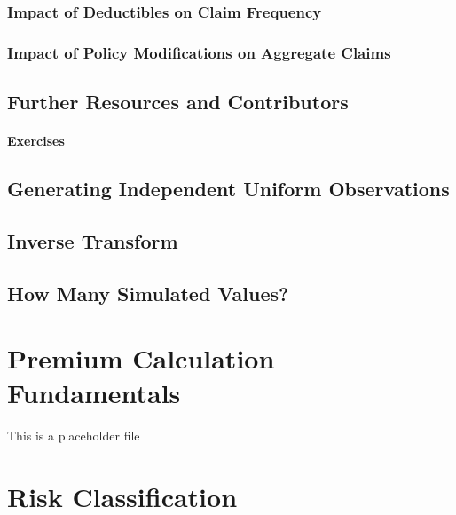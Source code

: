 \documentclass[]{book}
\theoremstyle{definition}
\theoremstyle{definition}
\theoremstyle{definition}
\theoremstyle{remark}
\begin{document}
\subsection{Impact of Deductibles on Claim
Frequency}\label{impact-of-deductibles-on-claim-frequency}

\subsection{Impact of Policy Modifications on Aggregate
Claims}\label{impact-of-policy-modifications-on-aggregate-claims}

\section{Further Resources and
Contributors}\label{AL-further-reading-and-resources}

\subsubsection*{Exercises}\label{exercises-1}

\section{Generating Independent Uniform
Observations}\label{generating-independent-uniform-observations}

\section{Inverse Transform}\label{inverse-transform}

\section{How Many Simulated Values?}\label{how-many-simulated-values}

\chapter{Premium Calculation Fundamentals}\label{C:PremCalc}

This is a placeholder file

\chapter{Risk Classification}\label{C:RiskClass}
\end{document}
